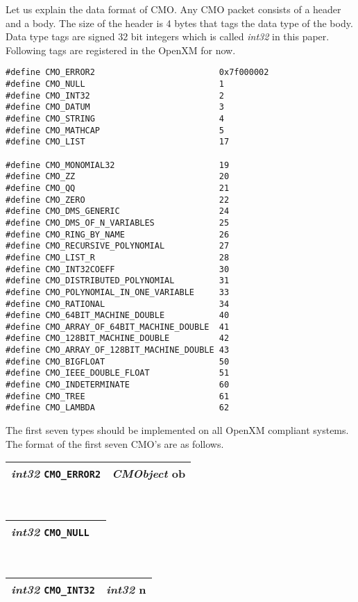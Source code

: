 Let us explain the data format of CMO.
Any CMO packet consists of a header and a body.
The size of the header is 4 bytes that tags the data type of the body.
Data type tags are signed 32 bit integers which is called {\sl int32} in this
paper.
Following tags are registered in the OpenXM for now.
\begin{verbatim}
#define CMO_ERROR2                         0x7f000002
#define CMO_NULL                           1
#define CMO_INT32                          2
#define CMO_DATUM                          3
#define CMO_STRING                         4
#define CMO_MATHCAP                        5
#define CMO_LIST                           17

#define CMO_MONOMIAL32                     19
#define CMO_ZZ                             20
#define CMO_QQ                             21
#define CMO_ZERO                           22
#define CMO_DMS_GENERIC                    24
#define CMO_DMS_OF_N_VARIABLES             25
#define CMO_RING_BY_NAME                   26
#define CMO_RECURSIVE_POLYNOMIAL           27
#define CMO_LIST_R                         28
#define CMO_INT32COEFF                     30
#define CMO_DISTRIBUTED_POLYNOMIAL         31
#define CMO_POLYNOMIAL_IN_ONE_VARIABLE     33
#define CMO_RATIONAL                       34
#define CMO_64BIT_MACHINE_DOUBLE           40
#define CMO_ARRAY_OF_64BIT_MACHINE_DOUBLE  41
#define CMO_128BIT_MACHINE_DOUBLE          42
#define CMO_ARRAY_OF_128BIT_MACHINE_DOUBLE 43
#define CMO_BIGFLOAT                       50
#define CMO_IEEE_DOUBLE_FLOAT              51
#define CMO_INDETERMINATE                  60
#define CMO_TREE                           61
#define CMO_LAMBDA                         62
\end{verbatim}
The first seven types should be implemented on all OpenXM compliant systems.
The format of the first seven CMO's are as follows. \\
\begin{tabular}{|c|c|}
\hline
{\sl int32} {\tt CMO\_ERROR2} & {\sl CMObject} {\rm ob} \\ 
\hline
\end{tabular} \\
\begin{tabular}{|c|c|}
\hline
{\sl int32} {\tt CMO\_NULL}  \\ 
\hline
\end{tabular} \\
\begin{tabular}{|c|c|}
\hline
{\sl int32} {\tt CMO\_INT32}& {\sl int32} {\rm n}  \\ 
\hline
\end{tabular} \\
